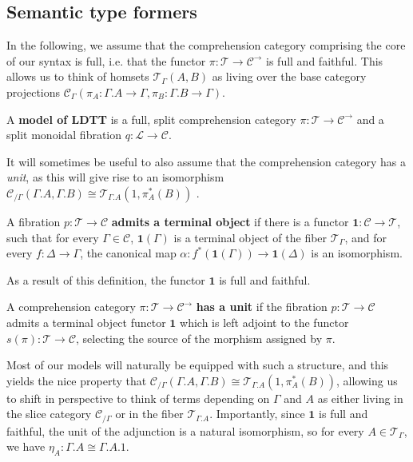 \subsection{Semantic type formers}\label{semtypform}
In the following, we assume that the comprehension category comprising the core of our syntax is full, i.e. that the functor $\pi : \mathcal{T} \to \mathcal{C}^{\to}$ is full and faithful. This allows us to think of homsets $\mathcal{T}_\Gamma(A, B)$ as living over the base category projections $\mathcal{C}_\Gamma(\pi_A : \Gamma.A \to \Gamma, \pi_B : \Gamma.B \to \Gamma)$.
\begin{defn}A \textbf{model of LDTT} is a full, split comprehension category $\pi : \mathcal{T} \to \mathcal{C}^{\to}$ and a split monoidal fibration $q : \mathcal{L} \to \mathcal{C}$.\\
\end{defn}
  It will sometimes be useful to also assume that the comprehension category has a \textit{unit}, as this will give rise to an isomorphism $\mathcal{C}_{/\Gamma}(\Gamma.A, \Gamma.B) \cong \mathcal{T}_{\Gamma.A}(1, \pi^*_A(B))$ \cite{jacobs}.
\begin{defn}
    A fibration $p : \mathcal{T} \to \mathcal{C}$ \textbf{admits a terminal object} if there is a functor $\mathbf{1} : \mathcal{C} \to \mathcal{T}$, such that for every $\Gamma \in \mathcal{C}$, $\mathbf{1}(\Gamma)$ is a terminal object of the fiber $\mathcal{T}_{\Gamma}$, and for every $f : \Delta \to \Gamma$, the canonical map $\alpha : f^*(\mathbf{1}(\Gamma)) \to \mathbf{1}(\Delta)$ is an isomorphism.
  \end{defn}
  As a result of this definition, the functor $\mathbf{1}$ is full and faithful.
  \begin{defn}
    A comprehension category $\pi : \mathcal{T} \to \mathcal{C}^{\to}$ \textbf{has a unit} if the fibration $p : \mathcal{T} \to \mathcal{C}$ admits a terminal object functor $\mathbf{1}$ which is left adjoint to the functor $s(\pi) : \mathcal{T} \to \mathcal{C}$, selecting the source of the morphism assigned by $\pi$.
  \end{defn}
  Most of our models will naturally be equipped with such a structure, and this yields the nice property that $\mathcal{C}_{/\Gamma}(\Gamma.A, \Gamma.B) \cong \mathcal{T}_{\Gamma.A}(1, \pi_A^*(B))$, allowing us to shift in perspective to think of terms depending on $\Gamma$ and $A$ as either living in the slice category $\mathcal{C}_{/\Gamma}$ or in the fiber $\mathcal{T}_{\Gamma.A}$. Importantly, since $\mathbf{1}$ is full and faithful, the unit of the adjunction is a natural isomorphism, so for every $A \in \mathcal{T}_\Gamma$, we have $\eta_A : \Gamma.A \cong \Gamma.A.1$.
